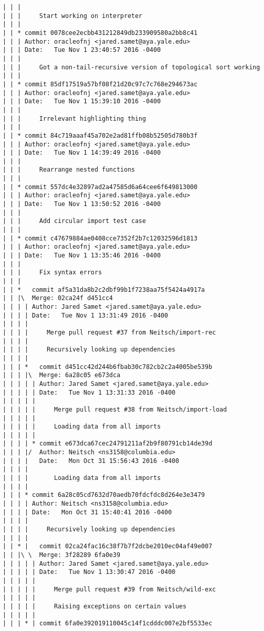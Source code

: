 \begin{lstlisting}
| | | 
| | |     Start working on interpreter
| | |    
| | * commit 0078cee2ecbb431212849db233909580a2bb8c41
| | | Author: oracleofnj <jared.samet@aya.yale.edu>
| | | Date:   Tue Nov 1 23:40:57 2016 -0400
| | | 
| | |     Got a non-tail-recursive version of topological sort working
| | |    
| | * commit 85df17519a57bf08f21d20c97c7c768e294673ac
| | | Author: oracleofnj <jared.samet@aya.yale.edu>
| | | Date:   Tue Nov 1 15:39:10 2016 -0400
| | | 
| | |     Irrelevant highlighting thing
| | |    
| | * commit 84c719aaaf45a702e2ad81ffb08b52505d780b3f
| | | Author: oracleofnj <jared.samet@aya.yale.edu>
| | | Date:   Tue Nov 1 14:39:49 2016 -0400
| | | 
| | |     Rearrange nested functions
| | |    
| | * commit 557dc4e32897ad2a47585d6a64cee6f649813000
| | | Author: oracleofnj <jared.samet@aya.yale.edu>
| | | Date:   Tue Nov 1 13:50:52 2016 -0400
| | | 
| | |     Add circular import test case
| | |    
| | * commit c47679884ae0408cce7352f2b7c12032596d1813
| | | Author: oracleofnj <jared.samet@aya.yale.edu>
| | | Date:   Tue Nov 1 13:35:46 2016 -0400
| | | 
| | |     Fix syntax errors
| | |      
| | *   commit af5a31da8b2c2dbf99b1f7238aa75f5424a4917a
| | |\  Merge: 02ca24f d451cc4
| | | | Author: Jared Samet <jared.samet@aya.yale.edu>
| | | | Date:   Tue Nov 1 13:31:49 2016 -0400
| | | | 
| | | |     Merge pull request #37 from Neitsch/import-rec
| | | |     
| | | |     Recursively looking up dependencies
| | | |       
| | | *   commit d451cc42d244b6fbab30c782cb2c2a4005be539b
| | | |\  Merge: 6a28c05 e673dca
| | | | | Author: Jared Samet <jared.samet@aya.yale.edu>
| | | | | Date:   Tue Nov 1 13:31:33 2016 -0400
| | | | | 
| | | | |     Merge pull request #38 from Neitsch/import-load
| | | | |     
| | | | |     Loading data from all imports
| | | | |      
| | | | * commit e673dca67cec24791211af2b9f80791cb14de39d
| | | |/  Author: Neitsch <ns3158@columbia.edu>
| | | |   Date:   Mon Oct 31 15:56:43 2016 -0400
| | | |   
| | | |       Loading data from all imports
| | | |     
| | | * commit 6a28c05cd7632d70aedb70fdcfdc8d264e3e3479
| | | | Author: Neitsch <ns3158@columbia.edu>
| | | | Date:   Mon Oct 31 15:40:41 2016 -0400
| | | | 
| | | |     Recursively looking up dependencies
| | | |       
| | * |   commit 02ca24fac16c38f7b7f2dcbe2010ec04af49e007
| | |\ \  Merge: 3f28289 6fa0e39
| | | | | Author: Jared Samet <jared.samet@aya.yale.edu>
| | | | | Date:   Tue Nov 1 13:30:47 2016 -0400
| | | | | 
| | | | |     Merge pull request #39 from Neitsch/wild-exc
| | | | |     
| | | | |     Raising exceptions on certain values
| | | | |      
| | | * | commit 6fa0e392019110045c14f1cdddc007e2bf5533ec

\end{lstlisting}
